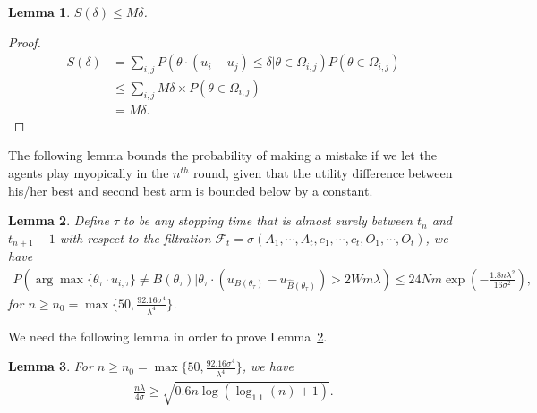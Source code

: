 \documentclass[twoside,11pt]{article}
\newtheorem{lemma}{Lemma}
\begin{document}
\begin{lemma}
$S(\delta)\leq M\delta$.
\label{lemma:sdelta}
\end{lemma}

\begin{proof}
\begin{align*}
S(\delta)
&=\sum_{i,j}P(\theta\cdot(u_{i}-u_{j})\le \delta|\theta\in \Omega_{i,j})P(\theta\in \Omega_{i,j}) \\
&\leq \sum_{i,j}M\delta \times P(\theta\in \Omega_{i,j}) \\
&=M\delta.
\end{align*}
\end{proof}

The following lemma bounds the probability of making a mistake if we let the agents play myopically in the $n^{th}$ round, given that the utility difference between his/her best and second best arm is bounded below by a constant. 

\begin{lemma}
Define $\tau$ to be any stopping time that is almost surely between $t_n$ and $t_{n+1}-1$ with respect to the filtration $\mathcal{F}_{t}=\sigma(A_1,\cdots,A_t,c_1,\cdots,c_t,O_1,\cdots,O_t)$, we have 
\begin{align}
P(\arg\max\{\theta_{\tau}\cdot u_{i,\tau}\}\neq B(\theta_{\tau})|\theta_{\tau}\cdot(u_{B(\theta_{\tau})}-u_{\hat{B}(\theta_{\tau})})> 2Wm\lambda)\leq 24Nm\exp\left(-\frac{1.8n\lambda^2}{16\sigma^2}\right), \nonumber
\end{align}
for $n\geq n_{0}=\max\{50, \frac{92.16\sigma^4}{\lambda^4}\}$.
\label{round:prob}
\end{lemma}


We need the following lemma in order to prove Lemma~\ref{round:prob}.

\begin{lemma}
For $n\geq n_{0}=\max\{50, \frac{92.16\sigma^4}{\lambda^4}\}$, we have
\begin{align}
\frac{n\lambda}{4\sigma}\geq \sqrt{0.6n\log(\log_{1.1}(n)+1)}. \nonumber
\end{align}
\label{n0-inequality}
\end{lemma}
\end{document}
